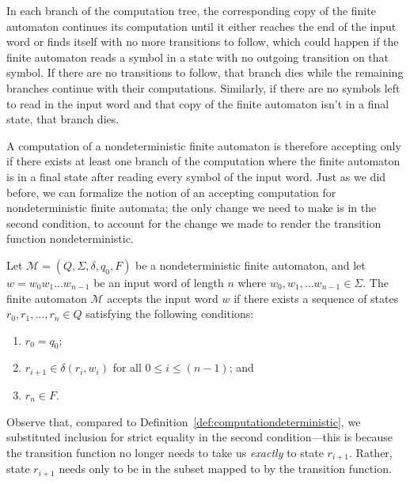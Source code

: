 In each branch of the computation tree, the corresponding copy of the finite automaton continues its computation until it either reaches the end of the input word or finds itself with no more transitions to follow, which could happen if the finite automaton reads a symbol in a state with no outgoing transition on that symbol. If there are no transitions to follow, that branch dies while the remaining branches continue with their computations. Similarly, if there are no symbols left to read in the input word and that copy of the finite automaton isn't in a final state, that branch dies.

A computation of a nondeterministic finite automaton is therefore accepting only if there exists at least one branch of the computation where the finite automaton is in a final state after reading every symbol of the input word. Just as we did before, we can formalize the notion of an accepting computation for nondeterministic finite automata; the only change we need to make is in the second condition, to account for the change we made to render the transition function nondeterministic.

\begin{definition}\label{def:computationnondeterministic}
Let $\mathcal{M} = (Q, \Sigma, \delta, q_{0}, F)$ be a nondeterministic finite automaton, and let $w = w_{0}w_{1} \dots w_{n-1}$ be an input word of length $n$ where $w_{0}, w_{1}, \dots w_{n-1} \in \Sigma$. The finite automaton $\mathcal{M}$ accepts the input word $w$ if there exists a sequence of states $r_{0}, r_{1}, \dots, r_{n} \in Q$ satisfying the following conditions:
\begin{enumerate}
\item $r_{0} = q_{0}$;
\item $r_{i+1} \in \delta(r_{i}, w_{i})$ for all $0 \leq i \leq (n-1)$; and
\item $r_{n} \in F$.
\end{enumerate}
\end{definition}

Observe that, compared to Definition~\ref{def:computationdeterministic}, we substituted inclusion for strict equality in the second condition---this is because the transition function no longer needs to take us \emph{exactly} to state $r_{i+1}$. Rather, state $r_{i+1}$ needs only to be in the subset mapped to by the transition function.

